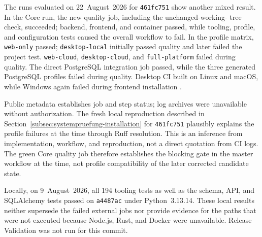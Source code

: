The runs evaluated on 22~August~2026 for \texttt{461fc751} show another mixed
result. In the Core run, the new quality job, including the unchanged-working-
tree check, succeeded; backend, frontend, and container passed, while tooling,
profile, and configuration tests caused the overall workflow to fail. In the
profile matrix, \texttt{web-only} passed; \texttt{desktop-local} initially
passed quality and later failed the project test. \texttt{web-cloud},
\texttt{desktop-cloud}, and \texttt{full-platform} failed during quality. The
direct PostgreSQL integration job passed, while the three generated PostgreSQL
profiles failed during quality. Desktop CI built on Linux and macOS, while
Windows again failed during frontend installation
\parencite{kleiveist2026governance-core-run,kleiveist2026governance-profiles-run,kleiveist2026governance-postgres-run,kleiveist2026governance-desktop-run}.

Public metadata establishes job and step status; log archives were unavailable
without authorization. The fresh local reproduction described in
Section~\ref{subsec:systempruefung-installation} for \texttt{461fc751}
plausibly explains the profile failures at the time through Ruff resolution.
This is an inference from implementation, workflow, and reproduction, not a
direct quotation from CI logs. The green Core quality job therefore establishes
the blocking gate in the master workflow at the time, not profile compatibility
of the later corrected candidate state.

Locally, on 9~August~2026, all 194 tooling tests as well as the schema, API, and
SQLAlchemy tests passed on \texttt{a4487ac} under Python~3.13.14. These local
results neither supersede the failed external jobs nor provide evidence for
the paths that were not executed because Node.js, Rust, and Docker were
unavailable. Release Validation was not run for this commit.
